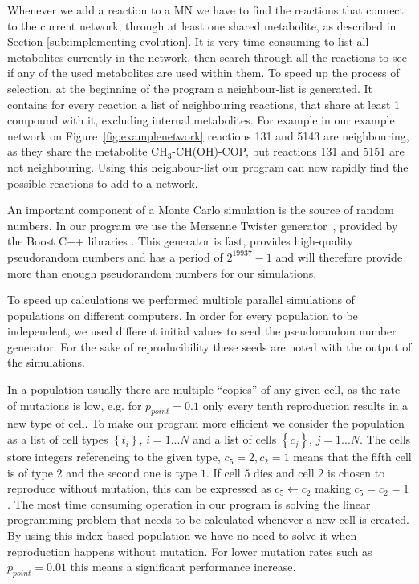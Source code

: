 \documentclass[a4paper,12pt]{article}
\begin{document}
	Whenever we add a reaction to a MN we have to find the reactions that connect to the current network, through at least one shared metabolite, as described in Section \ref{sub:implementing evolution}. It is very time consuming to list all metabolites currently in the network, then search through all the reactions to see if any of the used metabolites are used within them. To speed up the process of selection, at the beginning of the program a neighbour-list is generated. It contains for every reaction a list of neighbouring reactions, that share at least 1 compound with it, excluding internal metabolites. For example in our example network on Figure~\ref{fig:examplenetwork} reactions 131 and 5143 are neighbouring, as they share the metabolite CH$_3$-CH(OH)-COP, but reactions 131 and 5151 are not neighbouring. Using this neighbour-list our program can now rapidly find the possible reactions to add to a network. 

	An important component of a Monte Carlo simulation is the source of random numbers. In our program we use the Mersenne Twister generator~\cite{mersennetwister}, provided by the Boost C++ libraries \cite{boostlibraries}. This generator is fast, provides high-quality pseudorandom numbers and has a period of $2^{19937}-1$ and will therefore provide more than enough pseudorandom numbers for our simulations.

	To speed up calculations we performed multiple parallel simulations of populations on different computers. In order for every population to be independent, we used different initial values to seed the pseudorandom number generator. For the sake of reproducibility these seeds are noted with the output of the simulations. 

In a population usually there are multiple ``copies'' of any given cell, as the rate of mutations is low, e.g. for $p_{point}=0.1$ only every tenth reproduction results in a new type of cell. To make our program more efficient we consider the population as a list of cell types $ \left\{ t_i \right\}$, $i=1...N$ and a list of cells $\left\{ c_j \right\}$, $j=1...N$. The cells store integers referencing to the given type, $c_5=2, c_2=1$ means that the fifth cell is of type $2$ and the second one is type $1$. If cell $5$ dies and cell $2$ is chosen to reproduce without mutation, this can be expressed as $c_5 \leftarrow c_2$ making $c_5=c_2=1$. The most time consuming operation in our program is solving the linear programming problem that needs to be calculated whenever a new cell is created. By using this index-based population we have no need to solve it when reproduction happens without mutation. For lower mutation rates such as $p_{point}=0.01$ this means a significant performance increase. 
\end{document}
